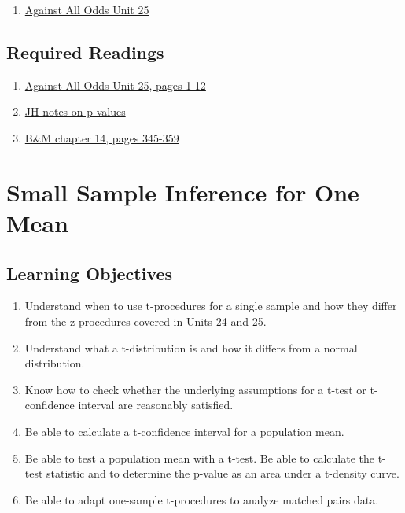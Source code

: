 \documentclass[letterpaper,9pt,twocolumn,twoside,printwatermark=false]{pinp}
\providecommand{\tightlist}{%
  \setlength{\itemsep}{0pt}\setlength{\parskip}{0pt}}
\begin{document}
\begin{enumerate}
\def\labelenumi{\arabic{enumi}.}
\tightlist
\item
  \href{https://www.learner.org/courses/againstallodds/unitpages/unit25.html}{Against
  All Odds Unit 25}
\end{enumerate}

\subsection{Required Readings}\label{required-readings-1}

\begin{enumerate}
\item \href{https://www.learner.org/courses/againstallodds/pdfs/AgainstAllOdds_StudentGuide_Unit25.pdf#page=1}{Against All Odds Unit 25, pages 1-12}
\item \href{http://www.medicine.mcgill.ca/epidemiology/hanley/BionanoWorkshop/P-Values.pdf}{JH notes on p-values}
\item \href{https://www.dropbox.com/s/luzhlatvx9hvwyn/Ch14IntroToInference.pdf?dl=0}{B\&M chapter 14, pages 345-359}
\end{enumerate}

\section{Small Sample Inference for One
Mean}\label{small-sample-inference-for-one-mean}

\subsection{Learning Objectives}\label{learning-objectives-2}

\begin{enumerate}
\def\labelenumi{\arabic{enumi}.}
\tightlist
\item
  Understand when to use t-procedures for a single sample and how they
  differ from the z-procedures covered in Units 24 and 25.
\item
  Understand what a t-distribution is and how it differs from a normal
  distribution.
\item
  Know how to check whether the underlying assumptions for a t-test or
  t-confidence interval are reasonably satisfied.
\item
  Be able to calculate a t-confidence interval for a population mean.
\item
  Be able to test a population mean with a t-test. Be able to calculate
  the t-test statistic and to determine the p-value as an area under a
  t-density curve.
\item
  Be able to adapt one-sample t-procedures to analyze matched pairs
  data.
\end{enumerate}
\end{document}
